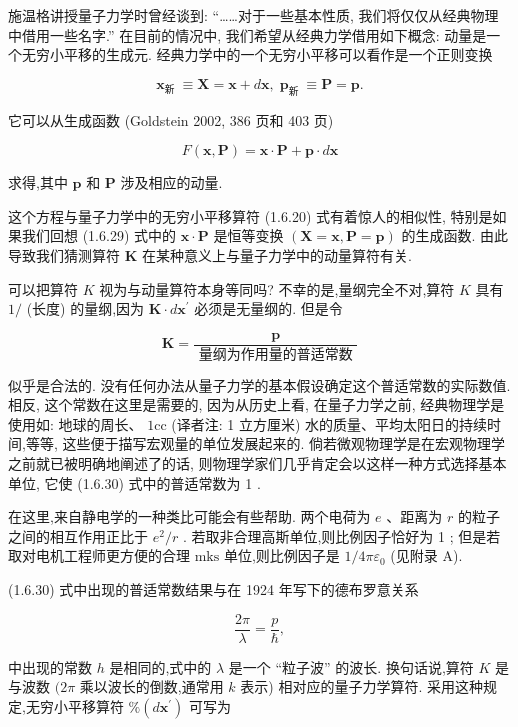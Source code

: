 \documentclass[lang=cn,newtx,10pt,scheme=chinese,thmcnt=section]{elegantbook}
\begin{document}
施温格讲授量子力学时曾经谈到: “……对于一些基本性质, 我们将仅仅从经典物理中借用一些名字.” 在目前的情况中, 我们希望从经典力学借用如下概念: 动量是一个无穷小平移的生成元. 经典力学中的一个无穷小平移可以看作是一个正则变换

$$
{\mathbf{x}}_{\text{新 }} \equiv \mathbf{X} = \mathbf{x} + d\mathbf{x},\;{\mathbf{p}}_{\text{新 }} \equiv \mathbf{P} = \mathbf{p}. \tag{1.6.28}
$$

它可以从生成函数 (Goldstein 2002, 386 页和 403 页)

$$
F\left( {\mathbf{x},\mathbf{P}}\right) = \mathbf{x} \cdot \mathbf{P} + \mathbf{p} \cdot d\mathbf{x} \tag{1.6.29}
$$

求得,其中 $\mathbf{p}$ 和 $\mathbf{P}$ 涉及相应的动量.

这个方程与量子力学中的无穷小平移算符 (1.6.20) 式有着惊人的相似性, 特别是如果我们回想 (1.6.29) 式中的 $\mathbf{x} \cdot \mathbf{P}$ 是恒等变换 $\left( {\mathbf{X} = \mathbf{x},\mathbf{P} = \mathbf{p}}\right)$ 的生成函数. 由此导致我们猜测算符 $\mathbf{K}$ 在某种意义上与量子力学中的动量算符有关.

可以把算符 $K$ 视为与动量算符本身等同吗? 不幸的是,量纲完全不对,算符 $K$ 具有 $1/$ (长度) 的量纲,因为 $\mathbf{K} \cdot d{\mathbf{x}}^{\prime }$ 必须是无量纲的. 但是令

$$
\mathbf{K} = \frac{\mathbf{p}}{\text{ 量纲为作用量的普适常数 }} \tag{1.6.30}
$$

似乎是合法的. 没有任何办法从量子力学的基本假设确定这个普适常数的实际数值. 相反, 这个常数在这里是需要的, 因为从历史上看, 在量子力学之前, 经典物理学是使用如: 地球的周长、 $1\mathrm{{cc}}$ (译者注: 1 立方厘米) 水的质量、平均太阳日的持续时间,等等, 这些便于描写宏观量的单位发展起来的. 倘若微观物理学是在宏观物理学之前就已被明确地阐述了的话, 则物理学家们几乎肯定会以这样一种方式选择基本单位, 它使 (1.6.30) 式中的普适常数为 1 .

在这里,来自静电学的一种类比可能会有些帮助. 两个电荷为 $e$ 、距离为 $r$ 的粒子之间的相互作用正比于 ${e}^{2}/r$ . 若取非合理高斯单位,则比例因子恰好为 1 ; 但是若取对电机工程师更方便的合理 $\mathrm{{mks}}$ 单位,则比例因子是 $1/{4\pi }{\varepsilon }_{0}$ (见附录 A).

(1.6.30) 式中出现的普适常数结果与在 1924 年写下的德布罗意关系

$$
\frac{2\pi }{\lambda } = \frac{p}{\hbar }, \tag{1.6.31}
$$

中出现的常数 $h$ 是相同的,式中的 $\lambda$ 是一个 “粒子波” 的波长. 换句话说,算符 $K$ 是与波数 $({2\pi }$ 乘以波长的倒数,通常用 $k$ 表示) 相对应的量子力学算符. 采用这种规定,无穷小平移算符 $\% \left( {d{\mathbf{x}}^{\prime }}\right)$ 可写为
\end{document}
